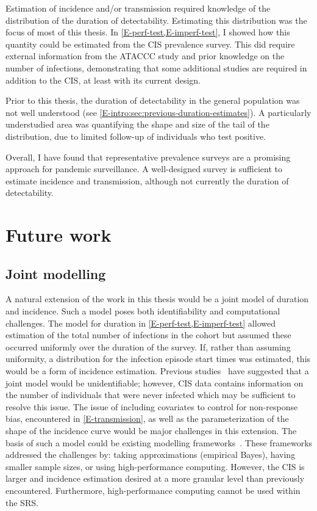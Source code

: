\documentclass[thesis.tex]{subfiles}
\begin{document}
Estimation of incidence and/or transmission required knowledge of the distribution of the duration of detectability.
Estimating this distribution was the focus of most of this thesis.
In \cref{E-perf-test,E-imperf-test}, I showed how this quantity could be estimated from the CIS prevalence survey.
This did require external information from the ATACCC study and prior knowledge on the number of infections, demonstrating that some additional studies are required in addition to the CIS, at least with its current design.

Prior to this thesis, the duration of detectability in the general population was not well understood (see \cref{E-intro:sec:previous-duration-estimates}).
A particularly understudied area was quantifying the shape and size of the tail of the distribution, due to limited follow-up of individuals who test positive.

Overall, I have found that representative prevalence surveys are a promising approach for pandemic surveillance.
A well-designed survey is sufficient to estimate incidence and transmission, although not currently the duration of detectability.


\section{Future work} \label{conclusion:sec:future-work}

\subsection{Joint modelling}

A natural extension of the work in this thesis would be a joint model of duration and incidence.
Such a model poses both identifiability and computational challenges.
The model for duration in \cref{E-perf-test,E-imperf-test} allowed estimation of the total number of infections in the cohort but assumed these occurred uniformly over the duration of the survey.
If, rather than assuming uniformity, a distribution for the infection episode start times was estimated, this would be a form of incidence estimation.
Previous studies~\autocite[e.g.][]{bacchettiNonparametric} have suggested that a joint model would be unidentifiable; however, CIS data contains information on the number of individuals that were never infected which may be sufficient to resolve this issue.
The issue of including covariates to control for non-response bias, encountered in \cref{E-transmission}, as well as the parameterization of the shape of the incidence curve would be major challenges in this extension.
The basis of such a model could be existing modelling frameworks~\autocite[e.g.][]{taffeJoint,haySerosolver}.
These frameworks addressed the challenges by: taking approximations (\eg empirical Bayes), having smaller sample sizes, or using high-performance computing.
However, the CIS is larger and incidence estimation desired at a more granular level than previously encountered.
Furthermore, high-performance computing cannot be used within the SRS.
\end{document}
